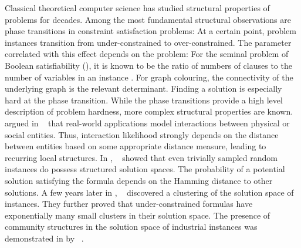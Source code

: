Classical theoretical computer science has studied structural properties of problems for decades. Among the most fundamental structural observations are phase transitions in constraint satisfaction problems: At a certain point, problem instances transition from under-constrained to over-constrained. The parameter correlated with this effect depends on the problem: For the seminal problem of Boolean satisfiability (\SAT), it is known to be the ratio of numbers of clauses to the number of variables in an instance \cite{Monasson:1999}. For graph colouring, the connectivity of the underlying graph is the relevant determinant. Finding a solution is especially hard at the phase transition. While the phase transitions provide a high level description of problem hardness, more complex structural properties are known. \citeauthor{hogg1996refining} argued in \citeyear{hogg1996refining}~\cite{hogg1996refining} that real-world applications model interactions between physical or social entities. Thus, interaction likelihood strongly depends on the distance between entities based on some appropriate distance measure, leading to recurring local structures. In \citeyear{PariLYQ04}, \citeauthor{PariLYQ04}~\cite{PariLYQ04} showed that even trivially sampled random \SAT instances do possess structured solution spaces. The probability of a potential solution satisfying the \SAT formula depends on the Hamming distance to other solutions. A few years later in \citeyear{achlioptas2011solution}, \citeauthor{achlioptas2011solution}~\cite{achlioptas2011solution} discovered a clustering of the solution space of \SAT instances. They further proved that under-constrained \SAT formulas have exponentially many small clusters in their solution space. The presence of community structures in the solution space of industrial \SAT instances was demonstrated in \citeyear{AnsoteguiGL12} by \citeauthor{AnsoteguiGL12}~\cite{AnsoteguiGL12}.

